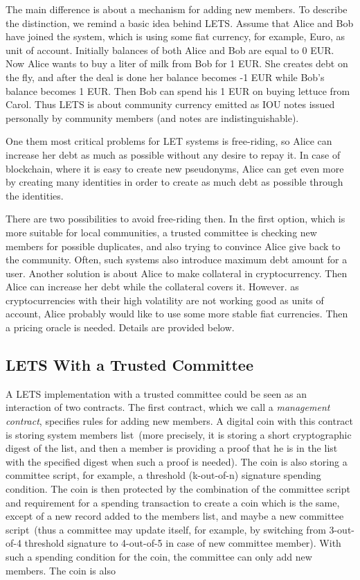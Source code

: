 \documentclass[]{llncs}   %
\begin{document}
The main difference is about a mechanism for adding new members. To describe the distinction, we remind a basic idea behind LETS. Assume that Alice and Bob have joined the system, which is using some fiat currency, for example, Euro, as unit of account. Initially
balances of both Alice and Bob are equal to 0 EUR. Now Alice wants to buy a liter of milk from Bob for 1 EUR. She creates debt on the fly, and after the deal is done her balance becomes -1 EUR while Bob's balance becomes 1 EUR. Then Bob can spend his 1 EUR on buying lettuce from Carol. Thus LETS is about community currency emitted as IOU notes issued personally by community members (and notes are indistinguishable).

One them most critical problems for LET systems is free-riding, so Alice can increase her debt as much as possible without any desire to repay it. In case of blockchain, where it is easy to create new pseudonyms, Alice can get even more by creating many identities in order to create as much debt as possible through the identities.

There are two possibilities to avoid free-riding then. In the first option, which is more suitable for local communities, a trusted committee is checking new members for possible duplicates, and also trying to convince Alice give back to the community. Often, such systems also introduce maximum debt amount for a user. Another solution is about Alice to make collateral in cryptocurrency. Then Alice
can increase her debt while the collateral covers it. However. as cryptocurrencies with their high volatility are not working good as units of account, Alice probably would like to use some more stable fiat currencies. Then a pricing oracle is needed. Details are provided below.

\subsection{LETS With a Trusted Committee}
\label{sec-trusted}

A LETS implementation with a trusted committee could be seen as an interaction of two contracts. The first contract, which we
call a {\em management contract}, specifies rules for adding new members. A digital coin with this contract is storing system members list~(more precisely, it is storing a short cryptographic digest of the list, and then a member is providing a proof that he is in the list with the specified digest when such a proof is needed). The coin is also storing a committee script, for example, a threshold (k-out-of-n) signature spending condition. The coin is then protected by the combination of the committee script and requirement for a 
spending transaction to create a coin which is the same, except of a new record added to the members list, and maybe a new committee script~(thus a committee may update itself, for example, by switching from 3-out-of-4 threshold signature to 4-out-of-5 in case of new committee member). With such a spending condition for the coin, the committee can only add new members. The coin is also 
\end{document}
